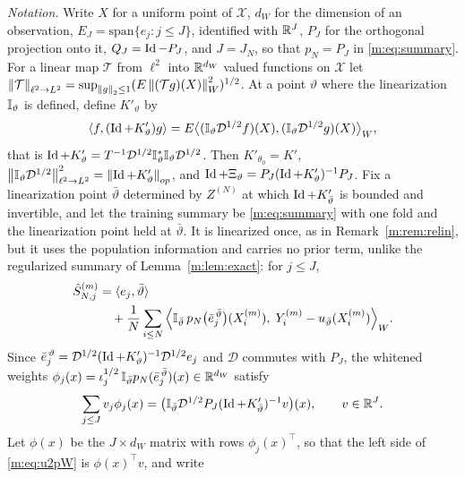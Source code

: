 \emph{Notation.} Write $X$ for a uniform point of $\mathcal X$, $d_W$ for the dimension of an observation, $E_J=\mathrm{span}\{e_j:j\le J\}$, identified with $\mathbb{R}^J$, $P_J$ for the orthogonal projection onto it, $Q_J=\operatorname{Id}-P_J$, and $J=J_N$, so that $p_N=P_J$ in \eqref{m:eq:summary}. For a linear map $\mathcal T$ from $\ell^2$ into $\mathbb{R}^{d_W}$ valued functions on $\mathcal X$ let $\left\|\mathcal T\right\|_{\ell^2\to L^2}=\sup_{\left\|g\right\|_2\le1}(E\left\|(\mathcal Tg)(X)\right\|^2_W)^{1/2}$. At a point $\vartheta$ where the linearization $\mathbb{I}_\vartheta$ is defined, define $K'_\vartheta$ by
\begin{equation}\label{m:eq:u2pF}
\langle f,(\operatorname{Id}+K'_\vartheta)g\rangle=E\big\langle(\mathbb{I}_\vartheta\mathcal D^{1/2}f)(X),(\mathbb{I}_\vartheta\mathcal D^{1/2}g)(X)\big\rangle_W ,
\end{equation}
that is $\operatorname{Id}+K'_\vartheta=T^{-1}\mathcal D^{1/2}\mathbb{I}^*_\vartheta\mathbb{I}_\vartheta\mathcal D^{1/2}$. Then $K'_{\theta_0}=K'$, $\left\|\mathbb{I}_\vartheta\mathcal D^{1/2}\right\|^2_{\ell^2\to L^2}=\left\|\operatorname{Id}+K'_\vartheta\right\|_{op}$, and $\operatorname{Id}+\Xi_\vartheta=P_J(\operatorname{Id}+K'_\vartheta)^{-1}P_J$. Fix a linearization point $\bar\vartheta$ determined by $Z^{(N)}$ at which $\operatorname{Id}+K'_{\bar\vartheta}$ is bounded and invertible, and let the training summary be \eqref{m:eq:summary} with one fold and the linearization point held at $\bar\vartheta$. It is linearized once, as in Remark~\ref{m:rem:relin}, but it uses the population information and carries no prior term, unlike the regularized summary of Lemma~\ref{m:lem:exact}: for $j\le J$,
\begin{equation}\label{m:eq:trainsummary}
\begin{aligned}
\hat S^{(m)}_{N,j}&=\langle e_j,\bar\vartheta\rangle\\
&\quad+\frac1N\sum_{i\le N}\Big\langle\mathbb{I}_{\bar\vartheta}\,p_N\big(\bar e_j^{\,\bar\vartheta}\big)(X^{(m)}_i),\;Y^{(m)}_i-u_{\bar\vartheta}(X^{(m)}_i)\Big\rangle_W .
\end{aligned}
\end{equation}
Since $\bar e_j^{\,\vartheta}=\mathcal D^{1/2}(\operatorname{Id}+K'_\vartheta)^{-1}\mathcal D^{1/2}e_j$ and $\mathcal D$ commutes with $P_J$, the whitened weights $\phi_j(x)=\iota_j^{1/2}\,\mathbb{I}_{\bar\vartheta}p_N(\bar e_j^{\,\bar\vartheta})(x)\in\mathbb{R}^{d_W}$ satisfy
\begin{equation}\label{m:eq:u2pW}
\sum_{j\le J}v_j\phi_j(x)=\big(\mathbb{I}_{\bar\vartheta}\mathcal D^{1/2}P_J(\operatorname{Id}+K'_{\bar\vartheta})^{-1}v\big)(x),\qquad v\in\mathbb{R}^J .
\end{equation}
Let $\phi(x)$ be the $J\times d_W$ matrix with rows $\phi_j(x)^\top$, so that the left side of \eqref{m:eq:u2pW} is $\phi(x)^\top v$, and write
